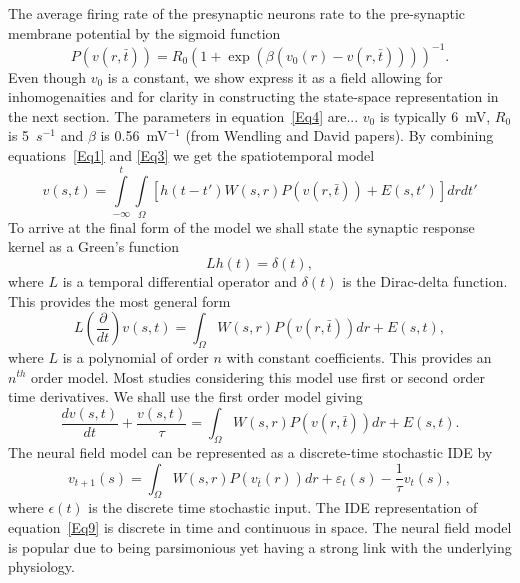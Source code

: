 \documentclass[journal]{IEEEtran}
\begin{document}
The average firing rate of the presynaptic neurons rate to the pre-synaptic membrane potential by the sigmoid function
\begin{equation}\label{Eq4}
P\left( {v\left( {r,\bar t} \right)} \right) = {R_0}{\left( {1 + \exp \left( {\beta \left( {{v_0}\left( r \right) - v\left( {r,\bar t} \right)} \right)} \right)} \right)^{ - 1}}.
\end{equation}
Even though $v_0$ is a constant, we show express it as a field allowing for inhomogenaities and for clarity in constructing the state-space representation in the next section. The parameters in equation~\ref{Eq4} are... $v_0$ is typically 6~mV, $R_0$ is 5~$s^{-1}$ and $\beta$ is 0.56~mV$^{-1}$ (from Wendling and David papers). By combining equations~\ref{Eq1} and \ref{Eq3} we get the spatiotemporal model
\begin{equation}\label{Eq5}
v\left(s,t\right) = \int\limits_{-\infty}^t\int\limits_\Omega \left[ h\left(t - t'\right)W\left(s,r\right)P\left( v\left( r,\bar t \right)\right)+E\left(s,t'\right)\right] dr dt'
\end{equation}
To arrive at the final form of the model we shall state the synaptic response kernel as a Green's function
\begin{equation}\label{Eq6}
Lh\left( t \right) = \delta \left( t \right),
\end{equation}
where $L$ is a temporal differential operator and $\delta(t)$ is the Dirac-delta function. This provides the most general form
\begin{equation}\label{Eq7}
L\left( {\frac{\partial }{{dt}}} \right)v\left( {s,t} \right) = \int_\Omega  {W\left( {s,r} \right)P\left( {v\left( {r,\bar t} \right)} \right)dr}  + E\left( {s,t} \right),
\end{equation}
where $L$ is a polynomial of order $n$ with constant coefficients. This provides an $n^{th}$ order model. Most studies considering this model use first or second order time derivatives. We shall use the first order model giving
\begin{equation}\label{Eq8}
\frac{{dv\left( {s,t} \right)}}{{dt}} + \frac{{v\left( {s,t} \right)}}{\tau } = \int_\Omega  {W\left( {s,r} \right)P\left( {v\left( {r,\bar t} \right)} \right)dr}  + E\left( {s,t} \right).
\end{equation}
The neural field model can be represented as a discrete-time stochastic IDE by
\begin{equation}\label{Eq9}
{v_{t + 1}}\left( s \right) = \int_\Omega  {W\left( {s,r} \right)P\left( {{v_{\bar t}}\left( r \right)} \right)dr}  + {\varepsilon _t}\left( s \right) - \frac{1}{\tau }{v_t}\left( s \right),
\end{equation}
where $\epsilon(t)$ is the discrete time stochastic input. The IDE representation of equation~\ref{Eq9} is discrete in time and continuous in space. The neural field model is popular due to being parsimonious yet having a strong link with the underlying physiology.
\end{document}

